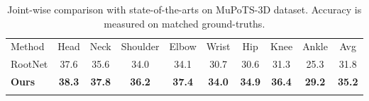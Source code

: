 \documentclass[runningheads]{llncs}
\begin{document}
\setlength{\tabcolsep}{4pt}
\begin{table}[t]
\begin{center}
\caption{Sequence-wise  comparison with state-of-the-arts on MuPoTS-3D dataset. Accuracy is measured on matched ground-truths.}
\label{table:seq_pck_abs_mupo}
\end{center}
\end{table}
\setlength{\tabcolsep}{1.4pt}

\setlength{\tabcolsep}{4pt}
\begin{table}[t]
\begin{center}
\caption{Joint-wise  comparison with state-of-the-arts on MuPoTS-3D dataset. Accuracy is measured on matched ground-truths.}
\label{table:joint_pck_abs_mupo}
\begin{tabular}{l|cccccccc|c}
\hline\noalign{\smallskip}
Method & Head & Neck & Shoulder & Elbow & Wrist & Hip & Knee & Ankle & Avg\\
\noalign{\smallskip}
\hline
\noalign{\smallskip}
RootNet \cite{Moon_2019_ICCV_3DMPPE} & 37.6 & 35.6 & 34.0 & 34.1 & 30.7 & 30.6 & 31.3 & 25.3 & 31.8\\
\textbf{Ours} & \textbf{38.3} & \textbf{37.8} & \textbf{36.2} & \textbf{37.4} & \textbf{34.0} & \textbf{34.9} & \textbf{36.4} & \textbf{29.2} & \textbf{35.2}\\
\noalign{\smallskip}
\hline
\end{tabular}
\end{center}
\end{table}
\setlength{\tabcolsep}{1.4pt}
\end{document}
